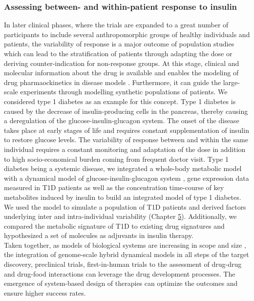 \subsubsection{Assessing between- and within-patient response to insulin}
In later clinical phases, where the trials are expanded to a great number of participants to include several anthropomorphic groups of healthy individuals and patients, the variability of response is a major outcome of population studies which can lead to the stratification of patients through adapting the dose or deriving counter-indication for non-response groups. At this stage, clinical and molecular information about the drug is available and enables the modeling of drug pharmaockinetics in disease models \cite{danhof2015kinetics,kuepfer2010towards}. Furthermore, it can guide the large-scale experiments through modelling synthetic populations of patients. We considered type 1 diabetes as an example for this concept. Type 1 diabetes is caused by the decrease of insulin-producing cells in the pancreas, thereby causing a deregulation of the glucose-insulin-glucagon system. The onset of the disease takes place at early stages of life and requires constant supplementation of insulin to restore glucose levels. The variability of response between and within the same individual requires a constant monitoring and adaptation of the dose in addition to high socio-economical burden coming from frequent doctor visit. Type 1 diabetes being a systemic disease, we integrated a whole-body metabolic model with a dynamical model of glucose-insulin-glucagon system \cite{schaller2013generic}, gene expression data measured in T1D patients as well as the concentration time-course of key metabolites induced by insulin to build an integrated model of type 1 diabetes. We used the model to simulate a population of T1D patients and derived factors underlying inter and intra-individual variability (Chapter \hyperref[ch:chapter5]{5}). Additionally, we compared the metabolic signature of T1D to existing drug signatures and hypothesized a set of molecules as adjuvants in insulin therapy.\\
Taken together, as models of biological systems are increasing in scope and size \cite{goldberg2018emerging}, the integration of genome-scale hybrid dynamical models in all steps of the target discovery, preclinical trials, first-in-human trials to the assessment of drug-drug and drug-food interactions can leverage the drug development processes. The emergence of system-based design of therapies can optimize the outcomes and ensure higher success rates.
